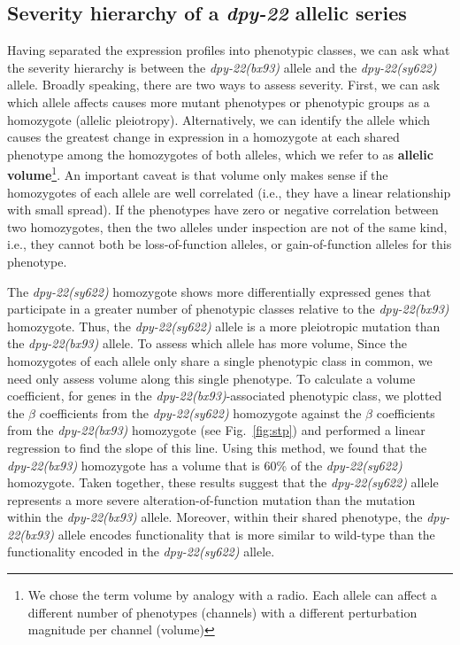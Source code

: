 \documentclass[8pt, twocolumn]{article}
\newcommand{\gene}[1]{\mbox{\emph{#1}}}
\newcommand{\dpy}[1]{\gene{dpy-22#1}}
\newcommand{\bx}{\dpy{(bx93)}}
\newcommand{\sy}{\dpy{(sy622)}}
\begin{document}
\subsection*{Severity hierarchy of a \gene{dpy-22} allelic series}
Having separated the expression profiles into phenotypic classes, we can ask
what the severity hierarchy is between the \bx{} allele and the \sy{} allele.
Broadly speaking, there are two ways to assess severity. First, we can ask which
allele affects causes more mutant phenotypes or phenotypic groups as a
homozygote (allelic pleiotropy). Alternatively, we can identify the allele which
causes the greatest change in expression in a homozygote at each shared
phenotype among the homozygotes of both alleles, which we refer to as
\textbf{allelic volume}\footnote{We chose the term volume by analogy with a
radio. Each allele can affect a different number of phenotypes (channels) with a
different perturbation magnitude per channel (volume)}. An important caveat is
that volume only makes sense if the homozygotes of each allele are well
correlated (i.e., they have a linear relationship with small spread). If the
phenotypes have zero or negative correlation between two homozygotes, then the
two alleles under inspection are not of the same kind, i.e., they cannot both be
loss-of-function alleles, or gain-of-function alleles for this phenotype.

The \sy{} homozygote shows more differentially expressed genes that participate
in a greater number of phenotypic classes relative to the \bx{} homozygote.
Thus, the \sy{} allele is a more pleiotropic mutation than the \bx{} allele. To
assess which allele has more volume,  Since the homozygotes of each allele only
share a single phenotypic class in common, we need only assess volume along
this single phenotype. To calculate a volume coefficient, for genes in the
\bx{}-associated phenotypic class, we plotted the $\beta$ coefficients from the
\sy{} homozygote against the $\beta$ coefficients from the \bx{} homozygote (see
Fig.~\ref{fig:stp}) and performed a linear regression to find the slope of this
line. Using this method, we found that the \bx{} homozygote has a volume that
is 60\% of the \sy{} homozygote. Taken together, these results suggest that the
\sy{} allele represents a more severe alteration-of-function mutation than the
mutation within the \bx{} allele. Moreover, within their shared phenotype, the
\bx{} allele encodes functionality that is more similar to wild-type than the
functionality encoded in the \sy{} allele.
\end{document}
